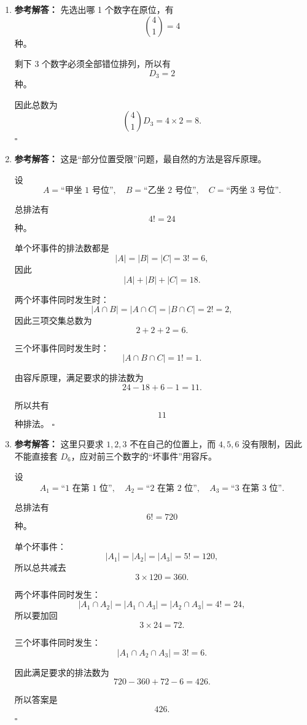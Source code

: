 \documentclass[11pt,a4paper,fontset=fandol]{ctexart}
\newenvironment{solution}{\par\noindent\textbf{参考解答：}}{\hfill$\square$\par}
\begin{document}
\begin{enumerate}
  \item \begin{solution}
  先选出哪 1 个数字在原位，有
  \[
  \binom{4}{1}=4
  \]
  种。

  剩下 3 个数字必须全部错位排列，所以有
  \[
  D_3=2
  \]
  种。

  因此总数为
  \[
  \binom{4}{1}D_3=4\times 2=8.
  \]
  \end{solution}

  \item \begin{solution}
  这是“部分位置受限”问题，最自然的方法是容斥原理。

  设
  \[
  A=\text{“甲坐 1 号位”},\quad
  B=\text{“乙坐 2 号位”},\quad
  C=\text{“丙坐 3 号位”}.
  \]

  总排法有
  \[
  4!=24
  \]
  种。

  单个坏事件的排法数都是
  \[
  |A|=|B|=|C|=3!=6,
  \]
  因此
  \[
  |A|+|B|+|C|=18.
  \]

  两个坏事件同时发生时：
  \[
  |A\cap B|=|A\cap C|=|B\cap C|=2!=2,
  \]
  因此三项交集总数为
  \[
  2+2+2=6.
  \]

  三个坏事件同时发生时：
  \[
  |A\cap B\cap C|=1!=1.
  \]

  由容斥原理，满足要求的排法数为
  \[
  24-18+6-1=11.
  \]

  所以共有
  \[
  11
  \]
  种排法。
  \end{solution}

  \item \begin{solution}
  这里只要求 $1,2,3$ 不在自己的位置上，而 $4,5,6$ 没有限制，因此不能直接套 $D_6$，应对前三个数字的“坏事件”用容斥。

  设
  \[
  A_1=\text{“1 在第 1 位”},\quad
  A_2=\text{“2 在第 2 位”},\quad
  A_3=\text{“3 在第 3 位”}.
  \]

  总排法有
  \[
  6!=720
  \]
  种。

  单个坏事件：
  \[
  |A_1|=|A_2|=|A_3|=5!=120,
  \]
  所以总共减去
  \[
  3\times 120=360.
  \]

  两个坏事件同时发生：
  \[
  |A_1\cap A_2|=|A_1\cap A_3|=|A_2\cap A_3|=4!=24,
  \]
  所以要加回
  \[
  3\times 24=72.
  \]

  三个坏事件同时发生：
  \[
  |A_1\cap A_2\cap A_3|=3!=6.
  \]

  因此满足要求的排法数为
  \[
  720-360+72-6=426.
  \]

  所以答案是
  \[
  426.
  \]
  \end{solution}


\end{enumerate}
\end{document}
